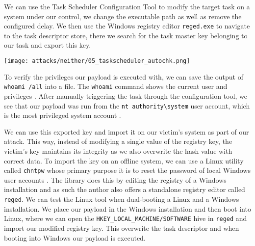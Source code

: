 We can use the Task Scheduler Configuration Tool to modify the target task on a system under our control, we change the executable path as well as remove the configured delay.
We then use the Windows registry editor \lstinline{reged.exe} to navigate to the task descriptor store, there we search for the task master key belonging to our task and export this key.

\texttt{[image: attacks/neither/05\_taskscheduler\_autochk.png]}

To verify the privileges our payload is executed with, we can save the output of \lstinline{whoami /all} into a file.
The \lstinline{whoami} command shows the current user and privileges \cite{microsoft-whoami}.
After manually triggering the task through the configuration tool, we see that our payload was run from the \lstinline{nt authority\system} user account, which is the most privileged system account \cite{microsoft-localsystem-account}.


We can use this exported key and import it on our victim's system as part of our attack.
This way, instead of modifying a single value of the registry key, the victim's key maintains its integrity as we also overwrite the hash value with correct data.
To import the key on an offline system, we can use a Linux utility called \lstinline{chntpw} whose primary purpose it is to reset the password of local Windows user accounts \cite{chntpw}.
The library does this by editing the registry of a Windows installation and as such the author also offers a standalone registry editor called \lstinline{reged}.
We can test the Linux tool when dual-booting a Linux and a Windows installation.
We place our payload in the Windows installation and then boot into Linux, where we can open the \lstinline{HKEY_LOCAL_MACHINE/SOFTWARE} hive in \lstinline{reged} and import our modified registry key.
This overwrite the task descriptor and when booting into Windows our payload is executed.

